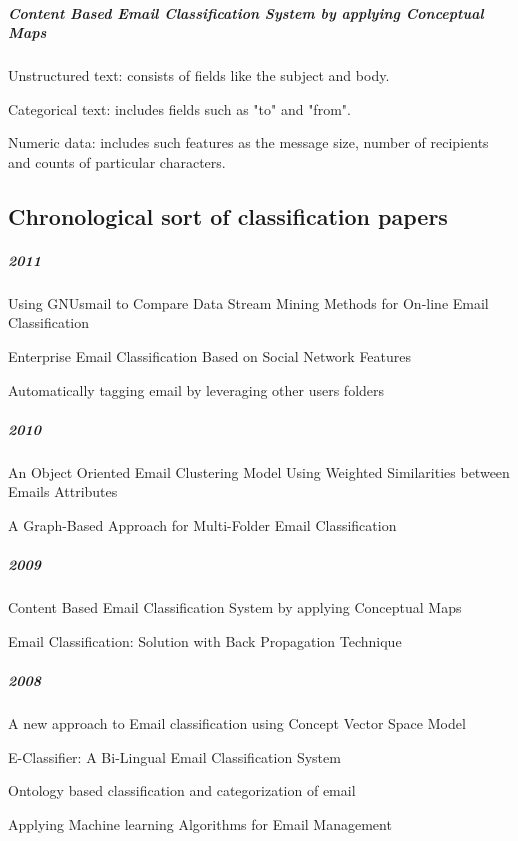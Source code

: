 	\subparagraph{Content Based Email Classification System by applying Conceptual Maps \cite{BASKARAN09}}
		\begin{my_itemize}
			\item Unstructured text: consists of fields like the subject and body.
			\item Categorical text: includes fields such as "to" and "from".
			\item Numeric data: includes such features as the message size, number of
recipients and counts of particular characters.
		\end{my_itemize}

\newpage
\subsection{Chronological sort of classification papers}
\subparagraph{2011}
\begin{my_itemize}
  \item Using GNUsmail to Compare Data Stream Mining Methods for On-line Email Classification \cite{JOSE11}
  \item Enterprise Email Classification Based on Social Network Features \cite{MIN11}
  \item Automatically tagging email by leveraging other users folders \cite{YEHUDA11}
\end{my_itemize}

\subparagraph{2010}
\begin{my_itemize}
  \item An Object Oriented Email Clustering Model Using Weighted Similarities between Emails Attributes \cite{NARESH10}
  \item A Graph-Based Approach for Multi-Folder Email Classification \cite{sift02}
\end{my_itemize}

\subparagraph{2009}
\begin{my_itemize}
  \item Content Based Email Classification System by applying Conceptual Maps \cite{BASKARAN09}
  \item Email Classification: Solution with Back Propagation Technique \cite{mous05}
\end{my_itemize}

\subparagraph{2008}
\begin{my_itemize}
  \item A new approach to Email classification using Concept Vector Space Model \cite{CHAO08}
  \item E-Classifier: A Bi-Lingual Email Classification System \cite{NOUF08}
  \item Ontology based classification and categorization of email \cite{BALAKUMAR08}
  \item Applying Machine learning Algorithms for Email Management \cite{mous03}
\end{my_itemize}

